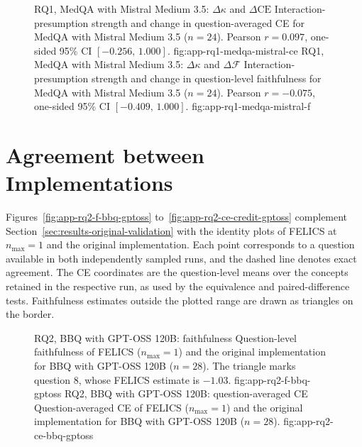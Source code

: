 \begin{figure}[H]
  \centering
    {RQ1, MedQA with Mistral Medium 3.5: $\Delta\kappa$ and $\Delta\mathrm{CE}$}%
    {Interaction-presumption strength and change in question-averaged CE for MedQA with Mistral Medium 3.5 ($n=24$). Pearson $r=0.097$, one-sided 95\% CI $[-0.256,\,1.000]$.}%
    {fig:app-rq1-medqa-mistral-ce}%
  \hfill
    {RQ1, MedQA with Mistral Medium 3.5: $\Delta\kappa$ and $\Delta\mathcal{F}$}%
    {Interaction-presumption strength and change in question-level faithfulness for MedQA with Mistral Medium 3.5 ($n=24$). Pearson $r=-0.075$, one-sided 95\% CI $[-0.409,\,1.000]$.}%
    {fig:app-rq1-medqa-mistral-f}%
\end{figure}

\section{Agreement between Implementations}
\label{app:rq2-identity}

Figures~\ref{fig:app-rq2-f-bbq-gptoss} to~\ref{fig:app-rq2-ce-credit-gptoss} complement Section~\ref{sec:results-original-validation} with the identity plots of FELICS at $n_{\max}=1$ and the original implementation. Each point corresponds to a question available in both independently sampled runs, and the dashed line denotes exact agreement. The CE coordinates are the question-level means over the concepts retained in the respective run, as used by the equivalence and paired-difference tests. Faithfulness estimates outside the plotted range are drawn as triangles on the border.

\begin{figure}[H]
  \centering
    {RQ2, BBQ with GPT-OSS 120B: faithfulness}%
    {Question-level faithfulness of FELICS ($n_{\max}=1$) and the original implementation for BBQ with GPT-OSS 120B ($n=28$). The triangle marks question 8, whose FELICS estimate is $-1.03$.}%
    {fig:app-rq2-f-bbq-gptoss}%
  \hfill
    {RQ2, BBQ with GPT-OSS 120B: question-averaged CE}%
    {Question-averaged CE of FELICS ($n_{\max}=1$) and the original implementation for BBQ with GPT-OSS 120B ($n=28$).}%
    {fig:app-rq2-ce-bbq-gptoss}%
\end{figure}

